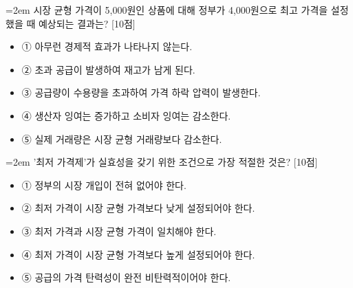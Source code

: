 \documentclass[10pt,a4paper]{article}
\newcommand{\qnum}[1]{%
  \tikz[baseline=(num.base)]{%
    \node[circle, fill=numCircle, text=white, inner sep=0pt,
          minimum size=18pt, font=\small\bfseries] (num) {#1};%
  }%
}
\newcommand{\pts}[1]{%
  \hfill\textcolor{ptsBadge}{[#1점]}%
}
\begin{document}
\vspace{4mm}
\begin{minipage}{\columnwidth}
{\hangindent=2em
\qnum{15}\enspace 시장 균형 가격이 5,000원인 상품에 대해 정부가 4,000원으로 최고 가격을 설정했을 때 예상되는 결과는? \pts{10}
\par}

\vspace{3mm}
\begin{itemize}[leftmargin=2.5em, labelsep=0.3em, label={}, itemsep=4pt, parsep=1pt, topsep=0pt]
  \item ① 아무런 경제적 효과가 나타나지 않는다.
  \item ② 초과 공급이 발생하여 재고가 남게 된다.
  \item ③ 공급량이 수용량을 초과하여 가격 하락 압력이 발생한다.
  \item ④ 생산자 잉여는 증가하고 소비자 잉여는 감소한다.
  \item ⑤ 실제 거래량은 시장 균형 거래량보다 감소한다.
\end{itemize}
\end{minipage}
\vspace{4mm}

\vspace{4mm}
\begin{minipage}{\columnwidth}
{\hangindent=2em
\qnum{16}\enspace '최저 가격제'가 실효성을 갖기 위한 조건으로 가장 적절한 것은? \pts{10}
\par}

\vspace{3mm}
\begin{itemize}[leftmargin=2.5em, labelsep=0.3em, label={}, itemsep=4pt, parsep=1pt, topsep=0pt]
  \item ① 정부의 시장 개입이 전혀 없어야 한다.
  \item ② 최저 가격이 시장 균형 가격보다 낮게 설정되어야 한다.
  \item ③ 최저 가격과 시장 균형 가격이 일치해야 한다.
  \item ④ 최저 가격이 시장 균형 가격보다 높게 설정되어야 한다.
  \item ⑤ 공급의 가격 탄력성이 완전 비탄력적이어야 한다.
\end{itemize}
\end{minipage}
\vspace{4mm}
\end{document}

